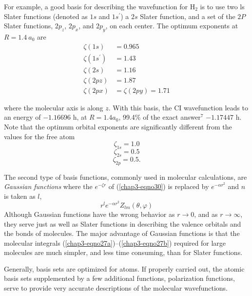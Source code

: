 For example, a good basis for describing the wavefunction for H$_2$ is
to use two ls Slater functions (denoted as $1s$ and $1s^{\prime}$) a
$2s$ Slater function, and a set of the $2P$ Slater functions, $2p_z$,
$2p_x$, and $2p_y$, on each center. The optimum exponents at $R =
1.4\ a_0$ are \cite{chap3-ref6}
\begin{eqnarray}
\zeta ( 1 s ) &= 0.965\\
\zeta ( 1 s^{\prime} ) &= 1.43\\
\zeta ( 2 s ) &= 1.16\\
\zeta ( 2 pz ) &= 1.87\\
\zeta (2 px ) &= \zeta ( 2py ) = 1.71
\end{eqnarray}

\noindent 
where the molecular axis is along $z$.  With this basis, the CI
wavefunction leads to an energy of $-1.16696$ h, at $R = 1.4a_0$,
99.4\% of the exact answer$^7$ $-1.17447$ h.  Note that the optimum
orbital exponents are significantly different from the values for the
free atom
\begin{equation}
\zeta_{1s} = 1.0
\end{equation}
\begin{equation}
\zeta_{2s} = 0.5
\end{equation}
\begin{equation}
\zeta_{2p} = 0. 5.
\end{equation}

The second type of basis functions, commonly used in molecular
calculations, are \emph{Gaussian functions} where the $e^{-\zeta r}$
of (\ref{chap3-eqno30}) is replaced by $e^{-\alpha r^2}$ and $n$ is
taken as $l$,
\begin{equation}
r^l e^{- \alpha r^2} Z_{lm} \left( \theta , \varphi \right)
\end{equation}
Although Gaussian functions have the wrong behavior as $r \rightarrow
0$, and as $r \rightarrow \infty$, they serve just as well as Slater
functions in describing the valence orbitals and the bonds of
molecules. The major advantage of Gaussian functions is that the
molecular integrals (\ref{chap3-eqno27a})--(\ref{chap3-eqno27b})
required for large molecules are much simpler, and less time
consuming, than for Slater functions.

Generally, basis sets are optimized for atoms.  If properly carried
out, the atomic basis sets supplemented by a few additional functions,
polarization functions, serve to provide very accurate descriptions of
the molecular wavefunctions.

